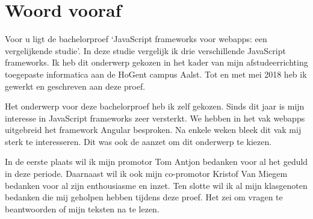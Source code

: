 
\chapter*{Woord vooraf}
\label{ch:voorwoord}

Voor u ligt de bachelorproef ‘JavaScript frameworks voor webapps: een vergelijkende studie’. In deze studie vergelijk ik drie verschillende JavaScript frameworks. Ik heb dit onderwerp gekozen in het kader van mijn afstudeerrichting toegepaste informatica aan de HoGent campus Aalst. Tot en met mei 2018 heb ik gewerkt en geschreven aan deze proef.

Het onderwerp voor deze bachelorproef heb ik zelf gekozen. Sinds dit jaar is mijn interesse in JavaScript frameworks zeer versterkt. We hebben in het vak webapps uitgebreid het framework Angular besproken. Na enkele weken bleek dit vak mij sterk te interesseren. Dit was ook de aanzet om dit onderwerp te kiezen.

In de eerste plaats wil ik mijn promotor Tom Antjon bedanken voor al het geduld in deze periode. Daarnaast wil ik ook mijn co-promotor Kristof Van Miegem bedanken voor al zijn enthousiasme en inzet. Ten slotte wil ik al mijn klasgenoten bedanken die mij geholpen hebben tijdens deze proef. Het zei om vragen te beantwoorden of mijn teksten na te lezen.


